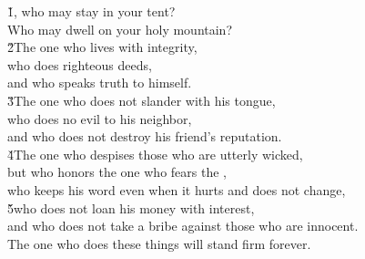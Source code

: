 \begin{poetry}
\poeml \v{1}, who may stay in your tent? \\
\poemll    Who may dwell on your holy mountain? \\
\poeml \v{2}The one who lives with integrity, \\
\poemll    who does righteous deeds, \\
\poemlll       and who speaks truth to himself. \\
\poeml \v{3}The one who does not slander with his tongue, \\
\poemll    who does no evil to his neighbor, \\
\poemlll       and who does not destroy his friend's reputation. \\
\poeml \v{4}The one who despises those who are utterly wicked, \\
\poemll    but who honors the one who fears the , \\
\poeml who keeps his word even when it hurts and does not change, \\
\poeml \v{5}who does not loan his money with interest, \\
\poemlll       and who does not take a bribe against those who are innocent. \\
\poeml The one who does these things will stand firm forever.
\end{poetry}

